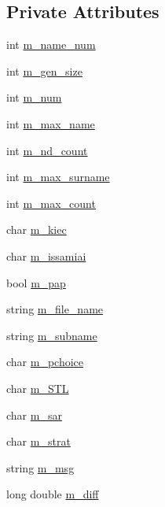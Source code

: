 \subsection*{Private Attributes}
\begin{DoxyCompactItemize}
\item 
int \mbox{\hyperlink{class_important___values_a0b2c98ab9fbc54b6dc465e149d977265}{m\+\_\+name\+\_\+num}}
\item 
int \mbox{\hyperlink{class_important___values_a5c9bcacfb0e4337d4cbd27c63975ca3a}{m\+\_\+gen\+\_\+size}}
\item 
int \mbox{\hyperlink{class_important___values_a328bd57138da4da12ff4c4677fd4fe6e}{m\+\_\+num}}
\item 
int \mbox{\hyperlink{class_important___values_a3446fa1ec4a1a98e76fd60515e99839a}{m\+\_\+max\+\_\+name}}
\item 
int \mbox{\hyperlink{class_important___values_ac3afa7ea54be87b10b2bd9c00b19d77e}{m\+\_\+nd\+\_\+count}}
\item 
int \mbox{\hyperlink{class_important___values_ac257916244b4f2f30ef78ed8fc8941e0}{m\+\_\+max\+\_\+surname}}
\item 
int \mbox{\hyperlink{class_important___values_a96e40dc81c7e04f89a344d61d52e1e83}{m\+\_\+max\+\_\+count}}
\item 
char \mbox{\hyperlink{class_important___values_a2036d21af20598fd36cf0d0cf411bce4}{m\+\_\+kiec}}
\item 
char \mbox{\hyperlink{class_important___values_a54b7216bc5fec7304da68e90d8475065}{m\+\_\+issamiai}}
\item 
bool \mbox{\hyperlink{class_important___values_af3934dca9b8f65c961b6f82463767f78}{m\+\_\+pap}}
\item 
string \mbox{\hyperlink{class_important___values_a3d8b0b1ab7d2a8313dcd68d0c4049b0d}{m\+\_\+file\+\_\+name}}
\item 
string \mbox{\hyperlink{class_important___values_aaf174acabe6d688864db630ce43e9ee8}{m\+\_\+subname}}
\item 
char \mbox{\hyperlink{class_important___values_a614f1e9edcfcd7fb5ec6c0decb4b04b4}{m\+\_\+pchoice}}
\item 
char \mbox{\hyperlink{class_important___values_a93fa7b9a15a7108c285ca96841108dd2}{m\+\_\+\+S\+TL}}
\item 
char \mbox{\hyperlink{class_important___values_a41f2be1730aaf1f29da43a31e77a05f9}{m\+\_\+sar}}
\item 
char \mbox{\hyperlink{class_important___values_ae00b36aa5ddf5999f964cf9d4e4007b6}{m\+\_\+strat}}
\item 
string \mbox{\hyperlink{class_important___values_aa9b5333b4034cc771187e55b4e70162e}{m\+\_\+msg}}
\item 
long double \mbox{\hyperlink{class_important___values_a885757c0c07d54f38b67180af1b443d5}{m\+\_\+diff}}
\end{DoxyCompactItemize}


